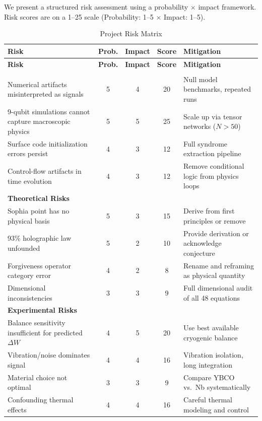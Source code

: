 \documentclass[11pt,a4paper]{article}
\begin{document}
We present a structured risk assessment using a probability $\times$ impact framework. Risk scores are on a 1--25 scale (Probability: 1--5 $\times$ Impact: 1--5).

\begin{longtable}{p{4.5cm}cccp{4.5cm}}
\caption{Project Risk Matrix} \\
\toprule
\textbf{Risk} & \textbf{Prob.} & \textbf{Impact} & \textbf{Score} & \textbf{Mitigation} \\
\midrule
\endfirsthead
\toprule
\textbf{Risk} & \textbf{Prob.} & \textbf{Impact} & \textbf{Score} & \textbf{Mitigation} \\
\midrule
\endhead
\bottomrule
\endfoot
\multicolumn{5}{l}{\textbf{Technical Risks}} \\
\midrule
Numerical artifacts misinterpreted as signals & 5 & 4 & 20 & Null model benchmarks, repeated runs \\
9-qubit simulations cannot capture macroscopic physics & 5 & 5 & 25 & Scale up via tensor networks ($N > 50$) \\
Surface code initialization errors persist & 4 & 3 & 12 & Full syndrome extraction pipeline \\
Control-flow artifacts in time evolution & 4 & 3 & 12 & Remove conditional logic from physics loops \\
\midrule
\multicolumn{5}{l}{\textbf{Theoretical Risks}} \\
\midrule
Sophia point has no physical basis & 5 & 3 & 15 & Derive from first principles or remove \\
93\% holographic law unfounded & 5 & 2 & 10 & Provide derivation or acknowledge conjecture \\
Forgiveness operator category error & 4 & 2 & 8 & Rename and reframing as physical quantity \\
Dimensional inconsistencies & 3 & 3 & 9 & Full dimensional audit of all 48 equations \\
\midrule
\multicolumn{5}{l}{\textbf{Experimental Risks}} \\
\midrule
Balance sensitivity insufficient for predicted $\Delta W$ & 4 & 5 & 20 & Use best available cryogenic balance \\
Vibration/noise dominates signal & 4 & 4 & 16 & Vibration isolation, long integration \\
Material choice not optimal & 3 & 3 & 9 & Compare YBCO vs.\ Nb systematically \\
Confounding thermal effects & 4 & 4 & 16 & Careful thermal modeling and control \\
\end{longtable}
\end{document}
